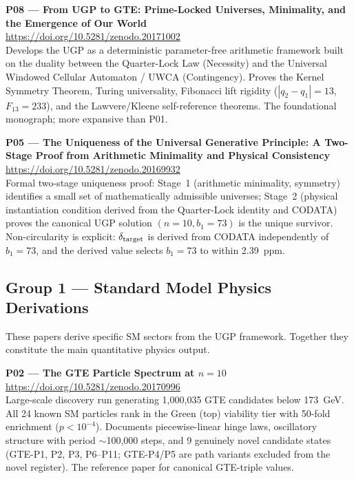 \documentclass[11pt]{article}
\begin{document}
\medskip
\noindent\textbf{P08 — From UGP to GTE: Prime-Locked Universes, Minimality,
and the Emergence of Our World}~\cite{Spivack2026_SMMonograph}\\
\url{https://doi.org/10.5281/zenodo.20171002}\\
Develops the UGP as a deterministic parameter-free arithmetic framework built
on the duality between the Quarter-Lock Law (Necessity) and the Universal
Windowed Cellular Automaton / UWCA (Contingency).  Proves the Kernel Symmetry
Theorem, Turing universality, Fibonacci lift rigidity ($|q_2 - q_1| = 13$,
$F_{13} = 233$), and the Lawvere/Kleene self-reference theorems.  The
foundational monograph; more expansive than P01.

\medskip
\noindent\textbf{P05 — The Uniqueness of the Universal Generative Principle:
A Two-Stage Proof from Arithmetic Minimality and Physical Consistency}~\cite{SpivackUGPUniqueness}\\
\url{https://doi.org/10.5281/zenodo.20169932}\\
Formal two-stage uniqueness proof: Stage~1 (arithmetic minimality, symmetry)
identifies a small set of mathematically admissible universes; Stage~2
(physical instantiation condition derived from the Quarter-Lock identity and
CODATA) proves the canonical UGP solution $(n=10, b_1=73)$ is the unique
survivor.  Non-circularity is explicit: $\delta_{\rm target}$ is derived
from CODATA independently of $b_1=73$, and the derived value selects $b_1=73$
to within 2.39~ppm.

\subsection{Group 1 — Standard Model Physics Derivations}

These papers derive specific SM sectors from the UGP framework.
Together they constitute the main quantitative physics output.

\medskip
\noindent\textbf{P02 — The GTE Particle Spectrum at $n=10$}~\cite{SpivackGTESpectrum}\\
\url{https://doi.org/10.5281/zenodo.20170996}\\
Large-scale discovery run generating 1,000,035 GTE candidates below 173~GeV.
All 24 known SM particles rank in the Green (top) viability tier with
50-fold enrichment ($p < 10^{-4}$).  Documents piecewise-linear hinge laws,
oscillatory structure with period $\sim$100,000 steps, and 9 genuinely novel
candidate states (GTE-P1, P2, P3, P6--P11; GTE-P4/P5 are path variants excluded
from the novel register).  The reference paper for canonical
GTE-triple values.
\end{document}
